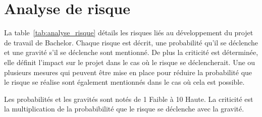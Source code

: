 \chapter{Analyse de risque}

La table~\ref{tab:analyse_risque} détails les risques liés au développement du projet de travail de Bachelor. Chaque risque est décrit, une probabilité qu’il se déclenche et une gravité s’il se déclenche sont mentionné. De plus la criticité est déterminée, elle définit l’impact sur le projet dans le cas où le risque se déclencherait. Une ou plusieurs mesures qui peuvent être mise en place pour réduire la probabilité que le risque se réalise sont également mentionnés dans le cas où cela est possible.

Les probabilités et les gravités sont notés de 1 Faible à 10 Haute. La criticité est la multiplication de la probabibilité que le risque se déclenche avec la gravité.

